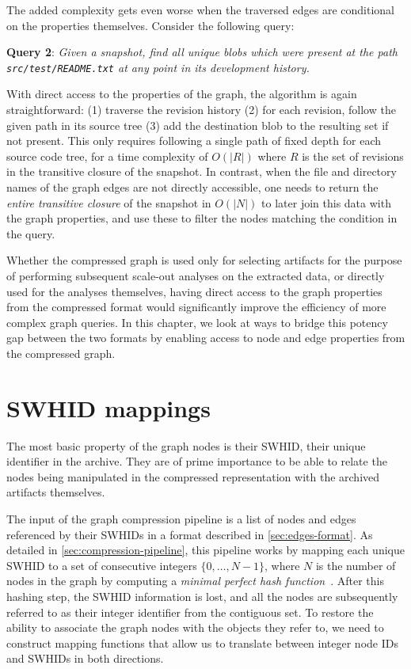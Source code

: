 The added complexity gets even worse when the traversed edges are conditional
on the properties themselves. Consider the following query:

\textbf{Query 2}: \emph{Given a snapshot, find all unique blobs which were
present at the path \allowbreak{}\texttt{src/test/README.txt} at any point in
its development history.}

With direct access to the properties of the graph, the algorithm is again
straightforward: (1) traverse the revision history (2) for each revision,
follow the given path in its source tree (3) add the destination blob to the
resulting set if not present. This only requires following a single path of
fixed depth for each source code tree, for a time complexity of $O(|R|)$ where
$R$ is the set of revisions in the transitive closure of the snapshot. In
contrast, when the file and directory names of the graph edges are not directly
accessible, one needs to return the \emph{entire transitive closure} of the
snapshot in $O(|N|)$ to later join this data with the graph properties, and use
these to filter the nodes matching the condition in the query.

Whether the compressed graph is used only for selecting artifacts for the
purpose of performing subsequent scale-out analyses on the extracted data, or
directly used for the analyses themselves, having direct access to the graph
properties from the compressed format would significantly improve the
efficiency of more complex graph queries.
In this chapter, we look at ways to bridge this potency gap between the two
formats by enabling access to node and edge properties from the compressed
graph.

\section{SWHID mappings}

The most basic property of the graph nodes is their \acrfull{SWHID}, their
unique identifier in the archive. They are of prime importance to be able to
relate the nodes being manipulated in the compressed representation with the
archived artifacts themselves.

The input of the graph compression pipeline is a list of nodes and edges
referenced by their \glspl{SWHID} in a format described in
\cref{sec:edges-format}.  As detailed in \cref{sec:compression-pipeline}, this
pipeline works by mapping each unique \gls{SWHID} to a set of consecutive
integers $\{0,\ldots,N-1\}$, where $N$ is the number of nodes in the graph by
computing a \emph{minimal perfect hash function}~\cite{GOVFSCF}.  After this
hashing step, the \gls{SWHID} information is lost, and all the nodes are
subsequently referred to as their integer identifier from the contiguous set.
To restore the ability to associate the graph nodes with the objects they refer
to, we need to construct mapping functions that allow us to translate between
integer node IDs and \glspl{SWHID} in both directions.

